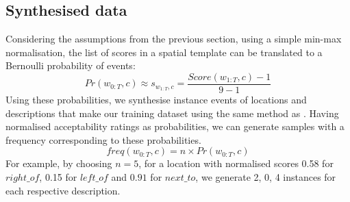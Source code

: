 \subsection{Synthesised data}\label{iwcs2017:sec:synth}

Considering the assumptions from the previous section, using a simple min-max normalisation, the
list of scores in a spatial template can be translated to a Bernoulli
probability of events:
\begin{equation}
Pr(w_{0:T}, c) \approx s_{w_{1:T}, c} = \frac{Score(w_{1:T}, c) - 1}{9 - 1}
\end{equation}
\noindent Using these probabilities, we synthesise instance events of 
locations and descriptions that make our training dataset using the same method as \cite{coventry2004spatial}. Having normalised acceptability ratings as probabilities, 
we can generate samples with a frequency corresponding to these probabilities.
\begin{equation}
freq(w_{0:T}, c) = n \times Pr(w_{0:T}, c) %
\end{equation}
\noindent For example, by choosing $n=5$, for a location with normalised scores 0.58 for
$right\_of$, 0.15 for $left\_of$ and $0.91$ for $next\_to$,
we generate 2, 0, 4 instances for each respective description.

